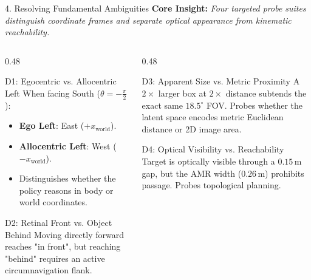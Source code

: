 \documentclass[aspectratio=169, 10pt]{beamer}
\begin{document}
\begin{frame}{4. Resolving Fundamental Ambiguities}
  \textbf{Core Insight:} \textit{Four targeted probe suites distinguish coordinate frames and separate optical appearance from kinematic reachability.}

  \vspace{0.2cm}
  \begin{columns}[T]
    \begin{column}{0.48\textwidth}
      \begin{block}{D1: Egocentric vs. Allocentric Left}
        \small
        When facing South ($\theta = -\frac{\pi}{2}$):
        \begin{itemize}
          \item \textbf{Ego Left}: East ($+x_{\text{world}}$).
          \item \textbf{Allocentric Left}: West ($-x_{\text{world}}$).
          \item Distinguishes whether the policy reasons in body or world coordinates.
        \end{itemize}
      \end{block}

      \begin{block}{D2: Retinal Front vs. Object Behind}
        \small
        Moving directly forward reaches "in front", but reaching "behind" requires an active circumnavigation flank.
      \end{block}
    \end{column}

    \begin{column}{0.48\textwidth}
      \begin{block}{D3: Apparent Size vs. Metric Proximity}
        \small
        A $2\times$ larger box at $2\times$ distance subtends the exact same $18.5^\circ$ FOV.
        Probes whether the latent space encodes metric Euclidean distance or 2D image area.
      \end{block}

      \begin{alertblock}{D4: Optical Visibility vs. Reachability}
        \small
        Target is optically visible through a $0.15\,\text{m}$ gap, but the AMR width ($0.26\,\text{m}$) prohibits passage. Probes topological planning.
      \end{alertblock}
    \end{column}
  \end{columns}
\end{frame}
\end{document}
